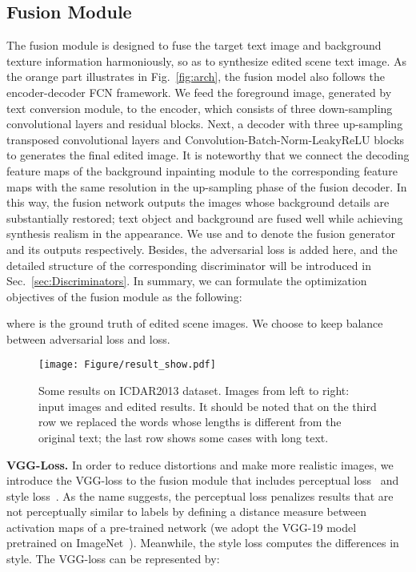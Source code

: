 \documentclass[sigconf]{acmart}
\begin{document}
\subsection{Fusion Module}
\label{sec:Fusion Module}
The fusion module is designed to fuse the target text image and background texture information harmoniously, so as to synthesize edited scene text image. 
As the orange part illustrates in Fig.~\ref{fig:arch}, the fusion model also follows the encoder-decoder FCN framework. 
We feed the foreground image, generated by text conversion module, to the encoder, which consists of three down-sampling convolutional layers and residual blocks. 
Next, a decoder with three up-sampling transposed convolutional layers and Convolution-Batch-Norm-LeakyReLU blocks to generates the final edited image. 
It is noteworthy that we connect the decoding feature maps of the background inpainting module to the corresponding feature maps with the same resolution in the up-sampling phase of the fusion decoder. 
In this way, the fusion network outputs the images whose background details are substantially restored; text object and background are fused well while achieving synthesis realism in the appearance. We use  and  to denote the fusion generator and its outputs respectively. Besides, the adversarial loss is added here, and the detailed structure of the corresponding discriminator  will be introduced in Sec.~\ref{sec:Discriminators}. In summary, we can formulate the optimization objectives of the fusion module as the following:


where  is the ground truth of edited scene images. We choose  to keep balance between adversarial loss and  loss.

\begin{figure*}[t]
    \centering
    \texttt{[image: Figure/result\_show.pdf]}

\caption{Some results on ICDAR2013 dataset. Images
from left to right: input images and edited results. It should be noted that on the third row we replaced the words whose lengths is different from the original text; the last row shows some cases with long text.}
\label{fig:result_show}
\vspace{-0.5cm}
\end{figure*}

\textbf{VGG-Loss.} In order to reduce distortions and make more realistic images, we introduce the VGG-loss to the fusion module that includes perceptual loss~\cite{johnson2016perceptual} and style loss~\cite{gatys2016image}. As the name suggests, the perceptual loss  penalizes results that are not perceptually similar to labels by defining a distance measure between activation maps of a pre-trained network (we adopt the VGG-19 model~\cite{simonyan2014very} pretrained on ImageNet~\cite{russakovsky2015imagenet}). Meanwhile, the style loss  computes the differences in style. The VGG-loss  can be represented by:
\end{document}
